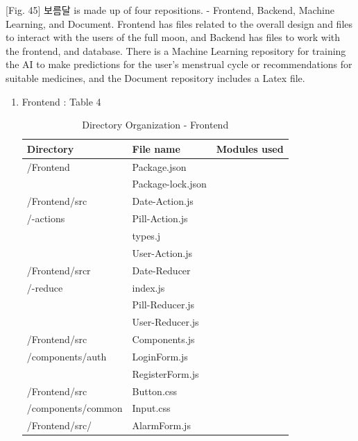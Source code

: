 \documentclass[conference]{IEEEtran}
\begin{document}
[Fig. 45] 보름달 is made up of four repositions. - Frontend, Backend, Machine Learning, and Document. Frontend has files related to the overall design and files to interact with the users of the full moon, and Backend has files to work with the frontend, and database. There is a Machine Learning repository for training the AI to make predictions for the user's menstrual cycle or recommendations for suitable medicines, and the Document repository includes a Latex file.
\begin{enumerate}
    \item Frontend : Table 4

    \begin{table}[h!]

        \begin{threeparttable}
            \caption{Directory Organization - Frontend%
            \label{tab:table5}}    %
            \begin{tabular}{p{2.4cm}p{2.8cm}p{2cm}}
            \toprule
            \bfseries Directory & \bfseries File name & \multicolumn{1}{l}{\bfseries Modules used} \\
            \midrule
            /Frontend & Package.json \\
            & Package-lock.json\\
            \hline
            /Frontend/src & Date-Action.js \\ 
           /-actions & Pill-Action.js \\
            & types.j \\
            & User-Action.js\\
            \hline
            /Frontend/srcr& Date-Reducer \\
           /-reduce & index.js \\
            & Pill-Reducer.js \\
            & User-Reducer.js \\
            \hline
           /Frontend/src & Components.js \\
            /components/auth& LoginForm.js \\
            & RegisterForm.js\\
            \hline
            /Frontend/src & Button.css \\
            /components/common& Input.css\\
            \hline
            /Frontend/src/ & AlarmForm.js \\

\end{tabular}
\end{threeparttable}
\end{table}
\end{enumerate}
\end{document}
